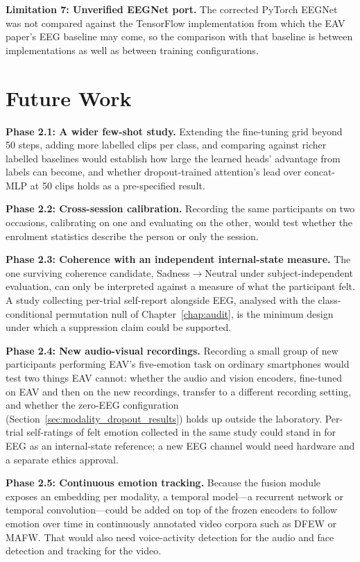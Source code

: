 \textbf{Limitation 7: Unverified EEGNet port.} The corrected PyTorch EEGNet was not compared against the TensorFlow implementation from which the EAV paper's EEG baseline may come, so the comparison with that baseline is between implementations as well as between training configurations.

\section{Future Work}

\textbf{Phase 2.1: A wider few-shot study.} Extending the fine-tuning grid beyond 50 steps, adding more labelled clips per class, and comparing against richer labelled baselines would establish how large the learned heads' advantage from labels can become, and whether dropout-trained attention's lead over concat-MLP at 50 clips holds as a pre-specified result.

\textbf{Phase 2.2: Cross-session calibration.} Recording the same participants on two occasions, calibrating on one and evaluating on the other, would test whether the enrolment statistics describe the person or only the session.

\textbf{Phase 2.3: Coherence with an independent internal-state measure.} The one surviving coherence candidate, Sadness$\rightarrow$Neutral under subject-independent evaluation, can only be interpreted against a measure of what the participant felt. A study collecting per-trial self-report alongside EEG, analysed with the class-conditional permutation null of Chapter~\ref{chap:audit}, is the minimum design under which a suppression claim could be supported.

\textbf{Phase 2.4: New audio-visual recordings.} Recording a small group of new participants performing EAV's five-emotion task on ordinary smartphones would test two things EAV cannot: whether the audio and vision encoders, fine-tuned on EAV and then on the new recordings, transfer to a different recording setting, and whether the zero-EEG configuration (Section~\ref{sec:modality_dropout_results}) holds up outside the laboratory. Per-trial self-ratings of felt emotion collected in the same study could stand in for EEG as an internal-state reference; a new EEG channel would need hardware and a separate ethics approval.

\textbf{Phase 2.5: Continuous emotion tracking.} Because the fusion module exposes an embedding per modality, a temporal model---a recurrent network or temporal convolution---could be added on top of the frozen encoders to follow emotion over time in continuously annotated video corpora such as DFEW or MAFW. That would also need voice-activity detection for the audio and face detection and tracking for the video.

